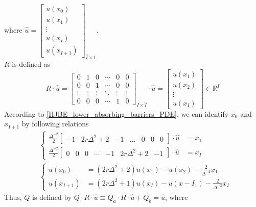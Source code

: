 \documentclass[11pt]{article}
\newcommand{\R}{\ensuremath{\mathbb{R}}}
\begin{document}
where $\hat{u} = \begin{bmatrix}
u(x_0)\\
u(x_1)\\
\vdots\\
u(x_I)\\
u(x_{I+1})
\end{bmatrix}_{\hat{I}\times 1}$.\\
$R$ is defined as 
\begin{equation}
R\cdot \hat{u} =\begin{bmatrix}
0&1&0&\cdots&0&0\\
0&0&1&\cdots&0&0\\
\vdots&\vdots&\vdots&\ddots&\vdots&\vdots\\
0&0&0&\cdots&1&0
\end{bmatrix}_{I\times\hat{I}}\cdot \hat{u}		 
=\begin{bmatrix}
u(x_1)\\
u(x_2)\\
\vdots\\
u(x_I)
\end{bmatrix} \in \R^{I} 
\end{equation}
According to \eqref{HJBE_lower_absorbing_barriers_PDE}, we can identify $x_0$ and $x_{I+1}$ by following relations
\begin{align}
&\begin{cases}
\frac{\Delta^{-2}}{2}\begin{bmatrix}
-1&2r\Delta^2+2&-1&\dots&0&0&0
\end{bmatrix}\cdot \hat{u} &= x_1\\
\frac{\Delta^{-2}}{2}\begin{bmatrix}
0&0&0&\cdots&-1&2r\Delta^2+2&-1
\end{bmatrix}\cdot \hat{u}& = x_I
\end{cases}\\
&\begin{cases}
u(x_0) &= (2r\Delta^2+2)u(x_1)-u(x_2) - \frac{2}{\Delta^{-2}}x_1\\
u(x_{I+1})&=(2r\Delta^2+1)u(x_I)-u(x-{I_1})-\frac{2}{\Delta^{-2}}x_I
\end{cases}
\end{align}
Thus, $Q$ is defined by $Q\cdot R\cdot\hat{u}\equiv Q_a\cdot R\cdot\hat{u}+Q_b = \hat{u}$, where
\end{document}
